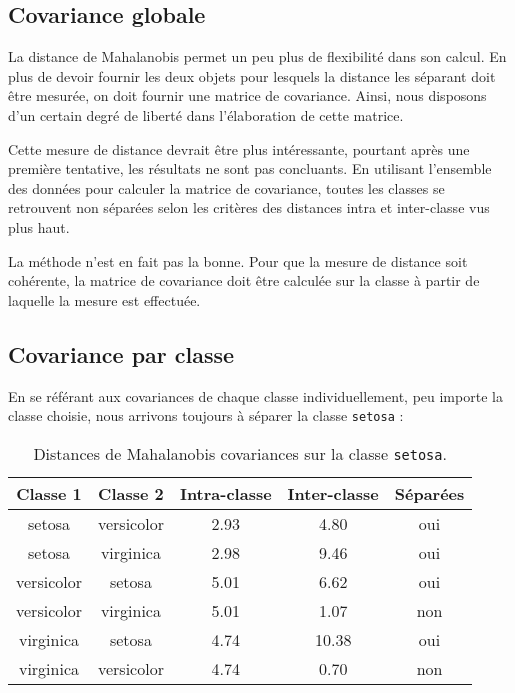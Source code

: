 \documentclass[french]{report}
\begin{document}
    \subsection{Covariance globale}
    
    La distance de Mahalanobis permet un peu plus de flexibilité dans son calcul.
    En plus de devoir fournir les deux objets pour lesquels la distance les séparant doit être mesurée, on doit fournir une matrice de covariance.
    Ainsi, nous disposons d'un certain degré de liberté dans l'élaboration de cette matrice.
    
    Cette mesure de distance devrait être plus intéressante, pourtant après une première tentative, les résultats ne sont pas concluants.
    En utilisant l'ensemble des données pour calculer la matrice de covariance, toutes les classes se retrouvent non séparées selon les critères des distances intra et inter-classe vus plus haut.
    
    La méthode n'est en fait pas la bonne.
    Pour que la mesure de distance soit cohérente, la matrice de covariance doit être calculée sur la classe à partir de laquelle la mesure est effectuée.
    
    \subsection{Covariance par classe}
    
    En se référant aux covariances de chaque classe individuellement, peu importe la classe choisie, nous arrivons toujours à séparer la classe \texttt{setosa} :
    
    \begin{table}[h]
        \centering
        \begin{tabular}{||c c c c c||}
            \hline
            \textbf{Classe 1} & \textbf{Classe 2} & \textbf{Intra-classe} & \textbf{Inter-classe} & \textbf{Séparées} \\
            \hline\hline
            setosa & versicolor & 2.93 & 4.80 & {\color{ForestGreen}oui} \\
            setosa & virginica & 2.98 & 9.46 & {\color{ForestGreen}oui} \\
            \hline
            versicolor & setosa & 5.01 & 6.62 & {\color{ForestGreen}oui} \\
            versicolor & virginica & 5.01 & 1.07 & {\color{BrickRed}non} \\
            \hline
            virginica & setosa & 4.74 & 10.38 & {\color{ForestGreen}oui} \\
            virginica & versicolor & 4.74 & 0.70 & {\color{BrickRed}non} \\
            \hline
        \end{tabular}
        \caption{Distances de Mahalanobis covariances sur la classe \texttt{setosa}.}
    \end{table}
    \leavevmode
    
\end{document}
